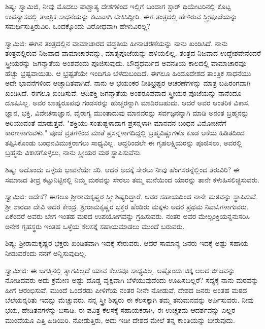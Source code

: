 ಶಿಷ್ಯ: ಸ್ವಾಮಿಜಿ, ನೀವು ಮೊದಲು ಪಾಶ್ಚಾತ್ಯ ದೇಶಗಳಿಂದ ಇಲ್ಲಿಗೆ ಬಂದಾಗ ಸ್ಟಾರ್ ಥಿಯೇಟರಿನಲ್ಲಿ ಕೊಟ್ಟ ಉಪನ್ಯಾಸದಲ್ಲಿ ತಾಂತ್ರಿಕ ಸಾಧನೆಯನ್ನು ಕಟುವಾಗಿ ಟೀಕಿಸಿದ್ದೀರಿ. ಈಗ ತಂತ್ರದಲ್ಲಿ ಹೇಳಿರುವ ಸ್ತ್ರೀಪೂಜೆಯನ್ನು ಸಮರ್ಥಿಸುತ್ತಿರುವಿರಿ. ಒಂದಕ್ಕೊಂದು ವಿರೋಧವಾಗಿ ಹೇಳುವಿರಲ್ಲ?

ಸ್ವಾಮಿಜಿ: ಈಗಿನ ತಂತ್ರದಲ್ಲಿನ ವಾಮಾಚಾರದ ಪದ್ಧತಿಯ ಹೀನಾಚರಣೆಯನ್ನು ನಾನು ಖಂಡಿಸಿದೆ. ನಾನು ತಂತ್ರದಲ್ಲಿರುವ ನಿಜವಾದ ವಾಮಾಚಾರವನ್ನು, ಮಾತೃಪೂಜೆಯನ್ನು ಹಳಿಯಲಿಲ್ಲ. ತಂತ್ರದ ನಿಜವಾದ ಉದ್ದೇಶವೇನೆಂದರೆ ಸ್ತ್ರೀಯರನ್ನು ಜಗನ್ಮಾತೆಯ ಅಂಶವೆಂದು ಪೂಜಿಸುವುದು. ಬೌದ್ಧಧರ್ಮದ ಅವನತಿಯ ಕಾಲದಲ್ಲಿ ವಾಮಾಚಾರವೂ ಹೆಚ್ಚು ಭ್ರಷ್ಟವಾಯಿತು. ಆ ಭ್ರಷ್ಟತೆಯೇ ಇಂದಿಗೂ ಬೆಳದುಬಂದಿದೆ. ಈಗಲೂ ಹಿಂದೂದೇಶದ ತಾಂತ್ರಿಕ ಸಾಧನೆಯು ಅದೇ ಭಾವನೆಗಳಿಂದ ಆಚ್ಛಾದಿತವಾಗಿದೆ. ನಾನು ಆ ಭಯಂಕರ ನೀತಿಭ್ರಷ್ಟರ ಆಚರಣೆಗಳನ್ನು ಮಾತ್ರ ಬಹಿರಂಗವಾಗಿ ಖಂಡಿಸಿದೆ. ಈಗಲೂ ಖಂಡಿಸುವೆ. ಆದಿಶಕ್ತಿ ಜಗನ್ಮಾತೆಯ ಅಂಶರೂಪವಾದ ಸ್ತ್ರೀಯರ ಪೂಜೆಯನ್ನು ನಾನೆಂದೂ ದೂಷಿಸಿಲ್ಲ. ಅವರ ಬಾಹ್ಯರೂಪವು ಗಂಡಸರನ್ನು ಹುಚ್ಚರನ್ನಾಗಿ ಮಾಡಿರಬಹುದು. ಆದರೆ ಅವರ ಆಂತರಿಕ ವಿಕಾಸ, ಜ್ಞಾನ, ಭಕ್ತಿ, ವಿವೇಚನಾಜ್ಞಾನ, ವೈರಾಗ್ಯ ಮುಂತಾದುವು ಮಾನವರನ್ನು ಸರ್ವಜ್ಞನನ್ನಾಗಿ ಮಾಡಿ ಅನಂತ ಬ್ರಹ್ಮನನ್ನು ಅರಿಯುವಂತೆ ಮಾಡುತ್ತವೆ. "ಶಕ್ತಿಯು ಸಂತುಷ್ಟಳಾದಾಗ ಪ್ರಸನ್ನಳಾಗಿ ಮಾನವನ ಬಂಧನ ವಿಮೋಚನೆಗೆ ಕಾರಣಳಾಗುವಳು." ಪೂಜೆ ವ್ರತಗಳಿಂದ ಮಾತೆ ಪ್ರಸನ್ನಳಾಗದಿದ್ದಲ್ಲಿ ಬ್ರಹ್ಮವಿಷ್ಣುಗಳೂ ಕೂಡ ಆಕೆಯ ಹಿಡಿತದಿಂದ ತಪ್ಪಿಸಿಕೊಂಡು ಬಂಧನವಿಮುಕ್ತರಾಗಲು ಸಾಧ್ಯವಿಲ್ಲ. ಆದ್ದರಿಂದಲೇ ಈ ಗೃಹಲಕ್ಷ್ಮಿಯರನ್ನು ಪೂಜಿಸಲು, ಅವರಲ್ಲಿ ಬ್ರಹ್ಮನು ವಿಕಾಸಗೊಳ್ಳಲು, ನಾನು ಸ್ತ್ರೀಯರ ಮಠ ಸ್ಥಾಪಿಸುವೆನು.

ಶಿಷ್ಯ: ಅದೊಂದು ಒಳ್ಳೆಯ ಭಾವನೆಯೇ ಸರಿ. ಆದರೆ ಅದಕ್ಕೆ ಸೇರಲು ನೀವು ಹೆಂಗಸರನ್ನೆಲ್ಲಿಂದ ತರುವಿರಿ? ಈ ಸಮಾಜದ ತೀವ್ರ ಕಟ್ಟುನಿಟ್ಟಿನಲ್ಲಿ ನಿಮ್ಮ ಮಠವನ್ನು ಸೇರಲು ತಮ್ಮ ಮನೆಯಿಂದ ಯಾರನ್ನು ತಾನೇ ಕಳುಹಿಸಲಿಚ್ಛಿಸುವರು.

ಸ್ವಾಮಿಜಿ: ಅದೇಕೆ? ಈಗಲೂ ಶ‍್ರೀರಾಮಕೃಷ್ಣರ ಸ್ತ್ರೀ ಶಿಷ್ಯರಿದ್ದಾರೆ. ಅವರ ಸಹಾಯದಿಂದ ನಾನೇ ಮಠವನ್ನು ಸ್ಥಾಪಿಸುವೆ. ಶ‍್ರೀ ಶಾರದಾ ದೇವಿ ಅದರ ಕೇಂದ್ರ. ಶ‍್ರೀರಾಮಕೃಷ್ಣರ ಭಕ್ತರ ಹೆಂಡಿರು ಮಕ್ಕಳು ಅದರ ಪ್ರಥಮ ನಿವಾಸಿಗಳಾಗುವರು. ಏಕೆಂದರೆ ಅವರು ಬೇಗ ಇಂತಹ ಮಠದ ಉಪಯೋಗವನ್ನು ಗ್ರಹಿಸುವರು. ನಂತರ ಅವರ ಮೇಲ್ಪಂಕ್ತಿಯನ್ನನುಸರಿಸಿ ಅನೇಕ ಗೃಹಸ್ಥರು ಇಂತಹ ಒಳ್ಳೆಯ ಕೆಲಸಕ್ಕೆ ಸಹಾಯಮಾಡಲು ಮುಂದೆ ಬರುವರು.

ಶಿಷ್ಯ: ಶ‍್ರೀರಾಮಕೃಷ್ಣರ ಭಕ್ತರು ಖಂಡಿತವಾಗಿ ಇದಕ್ಕೆ ಸೇರುವರು. ಆದರೆ ಸಾಮಾನ್ಯ ಜನರು ಇದಕ್ಕೆ ಅಷ್ಟು ಸಹಾಯ ನೀಡುವರೆಂದು ನನಗೆ ಅನ್ನಿಸುವುದಿಲ್ಲ.

ಸ್ವಾಮೀಜಿ: ಈ ಜಗತ್ತಿನಲ್ಲಿ ತ್ಯಾಗವಿಲ್ಲದೆ ಯಾವ ಕೆಲಸವೂ ಸಾಧ್ಯವಿಲ್ಲ. ಅಷ್ಟೊಂದು ಚಿಕ್ಕ ಆಲದ ಬೀಜವನ್ನು ನೋಡಿದವರು ಅದು ಕ್ರಮೇಣ ಅಷ್ಟು ದೊಡ್ಡ ವೃಕ್ಷವಾಗಿ ಬೆಳೆಯುವುದೆಂದು ಊಹಿಸಬಲ್ಲರೆ? ಸದ್ಯಕ್ಕೆ ನಾನು ಮಠವನ್ನು ಹೀಗೆ ಆರಂಭಿಸುವೆ, ಮುಂದೆ ಒಂದೆರಡು ಪೀಳಿಗೆಯ ನಂತರ ನೀನೇ ನೋಡುವೆ, ದೇಶದ ಜನರು ಅಂತಹ ಮಠದ ಬೆಲೆಯನ್ನರಿತು ಇದನ್ನು ಮೆಚ್ಚುವರು. ನನ್ನ ಸ್ತ್ರೀ ಶಿಷ್ಯರು ಈ ಕೆಲಸಕ್ಕಾಗಿ ತಮ್ಮ ತನುಮನವನ್ನು ಅರ್ಪಿಸುವರು. ನೀವು ಭಯ, ಹೇಡಿತನಗಳನ್ನು ಬಿಸಾಡಿ. ಈ ಪವಿತ್ರ ಕೆಲಸಕ್ಕೆ ಸಹಾಯಕರಾಗಿ, ಈ ಉಚ್ಚತಮ ಆದರ್ಶವನ್ನು ಎಲ್ಲರ ಮುಂದೆಯೂ ಎತ್ತಿ ಹಿಡಿಯಿರಿ. ನೋಡುತ್ತಿರು, ಅದು ಇಡೀ ದೇಶದ ಮೇಲೆ ತನ್ನ ಕಾಂತಿಯನ್ನು ಬೀರುವುದು.

